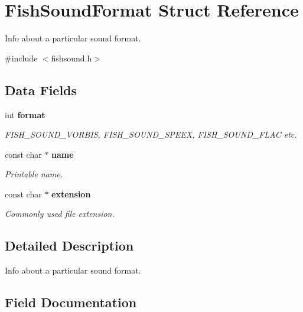\section{Fish\-Sound\-Format Struct Reference}
\label{structFishSoundFormat}


Info about a particular sound format.  




{\ttfamily \#include $<$fishsound.\-h$>$}

\subsection*{Data Fields}
\begin{DoxyCompactItemize}
\item 
int {\bf format}
\begin{DoxyCompactList}\small\item\em F\-I\-S\-H\-\_\-\-S\-O\-U\-N\-D\-\_\-\-V\-O\-R\-B\-I\-S, F\-I\-S\-H\-\_\-\-S\-O\-U\-N\-D\-\_\-\-S\-P\-E\-E\-X, F\-I\-S\-H\-\_\-\-S\-O\-U\-N\-D\-\_\-\-F\-L\-A\-C etc. \end{DoxyCompactList}\item 
const char $\ast$ {\bf name}\label{structFishSoundFormat_acb3416e65b3622a229f5eb835edc1ac0}

\begin{DoxyCompactList}\small\item\em Printable name. \end{DoxyCompactList}\item 
const char $\ast$ {\bf extension}\label{structFishSoundFormat_ada9c478e59bad75dc2a0b4cb012534b9}

\begin{DoxyCompactList}\small\item\em Commonly used file extension. \end{DoxyCompactList}\end{DoxyCompactItemize}


\subsection{Detailed Description}
Info about a particular sound format. 

\subsection{Field Documentation}
